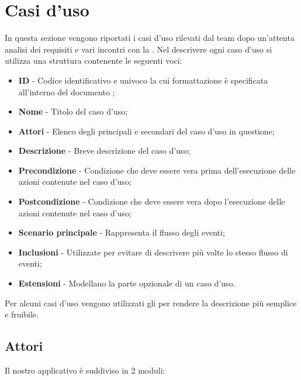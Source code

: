 \section{Casi d'uso} \label{casi uso}

    In questa sezione vengono riportati i casi d'uso rilevati dal team dopo un'attenta analisi dei requisiti e
    vari incontri con la .
    Nel descrivere ogni caso d'uso si utilizza una struttura contenente le seguenti voci:

        \begin{itemize}

            \item \textbf{ID} - Codice identificativo e univoco la cui formattazione è specificata all'interno del
            documento \vNormeDiProgetto;
            \item \textbf{Nome} - Titolo del caso d'uso;
            \item \textbf{Attori} - Elenco degli  principali e secondari del caso d'uso in questione;
            \item \textbf{Descrizione} - Breve descrizione del caso d'uso;
            \item \textbf{Precondizione} - Condizione che deve essere vera prima dell'esecuzione delle azioni contenute nel caso d'uso;
            \item \textbf{Postcondizione} - Condizione che deve essere vera dopo l'esecuzione delle azioni contenute nel
            caso d'uso;
            \item \textbf{Scenario principale} - Rappresenta il flusso degli eventi;
            \item \textbf{Inclusioni} - Utilizzate per evitare di descrivere più volte lo stesso flusso di eventi;
            \item \textbf{Estensioni} - Modellano la parte opzionale di un caso d'uso.

        \end{itemize}

    Per alcuni casi d'uso vengono utilizzati gli  per rendere la descrizione più
    semplice e fruibile.

    \subsection{Attori} \label{attori}

        Il nostro applicativo è suddiviso in 2 moduli:

